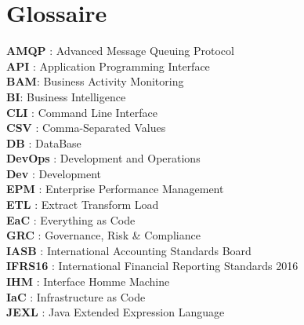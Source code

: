\chapter*{Glossaire}


\textbf{AMQP} : Advanced Message Queuing Protocol\\

\textbf{API} : Application Programming Interface\\

\textbf{BAM}: Business Activity Monitoring\\

\textbf{BI}: Business Intelligence\\

\textbf{CLI} : Command Line Interface\\

\textbf{CSV} : Comma-Separated Values\\

\textbf{DB} : DataBase\\

\textbf{DevOps} : Development and Operations\\

\textbf{Dev} : Development\\

\textbf{EPM} : Enterprise Performance Management\\

\textbf{ETL} : Extract Transform Load \\

\textbf{EaC} : Everything as Code\\

\textbf{GRC} : Governance, Risk \& Compliance\\

\textbf{IASB} : International Accounting Standards Board\\

\textbf{IFRS16} : International Financial Reporting Standards 2016\\

\textbf{IHM} : Interface Homme Machine\\


\textbf{IaC} : Infrastructure as Code\\

\textbf{JEXL} : Java Extended Expression Language\\

